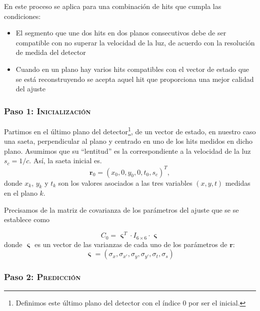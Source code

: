 \documentclass[a4paper]{article}
\let\vec\mathbf  %
\begin{document}
En este proceso se aplica para una combinación de hits que cumpla las condiciones:
\begin{itemize}
    \item El segmento que une dos hits en dos planos consecutivos debe de ser compatible con no  superar la velocidad de la luz, de acuerdo con la resolución de medida del detector
    \item Cuando en un plano hay varios hits compatibles con el vector de estado que se está reconstruyendo se acepta aquel hit que proporciona una mejor calidad del ajuste
\end{itemize}

\subsubsection{Paso 1: \textsc{Inicialización}}

Partimos en el último plano del detector\footnote{Definimos este último plano del detector con el índice $0$ por ser el inicial.}, de un vector de estado, en nuestro caso una saeta, perpendicular al plano y centrado en uno de los hits medidos en dicho plano. Asumimos que su ``lentitud'' es la correspondiente a la velocidad de la luz $s_c = 1/c$. Así, la saeta inicial es.
\begin{equation}
    \vec{r}_0 = (x_0, 0, y_0, 0, t_0, s_c)^T,
    \label{eq:init}
\end{equation}  %
donde $x_k$, $y_k$ y $t_k$ son los valores asociados a las tres variables $(x,y,t)$ medidas en el plano $k$.

Precisamos de la matriz de covarianza  de los parámetros del ajuste que se se establece como

\begin{equation}
    C_0 = \vec{\upvarsigma}^T \cdot I_{6 \times 6} \cdot \vec{\upvarsigma}
    \label{eq:cov}
\end{equation}
donde $\vec{\upvarsigma}$ es un vector de las  varianzas de cada uno de los parámetros de $\vec{r}$:
\begin{equation}
    \vec{\upvarsigma} = (\sigma_x, \sigma_{x'}, \sigma_y, \sigma_{y'}, \sigma_t, \sigma_s)
    \label{eq:sigmas}
\end{equation}

\subsubsection{Paso 2: \textsc{Predicción}}
\end{document}
